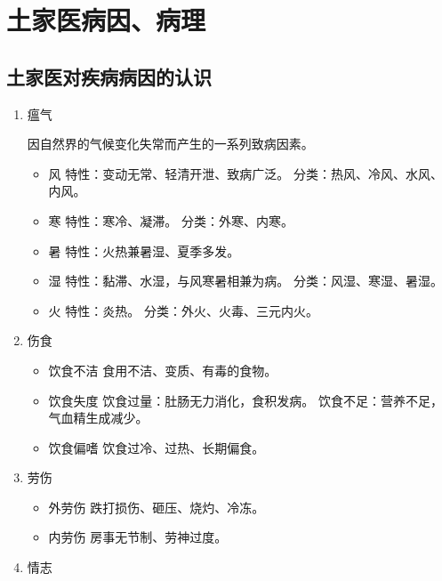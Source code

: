 \documentclass[cn,hazy,black,12pt,normal,founder]{elegantnote}
\begin{document}
\section{土家医病因、病理}

\subsection{土家医对疾病病因的认识}

\begin{enumerate}
  \item 瘟气

  因自然界的气候变化失常而产生的一系列致病因素。

  \begin{itemize}
    \item 风
    \subitem 特性：变动无常、轻清开泄、致病广泛。
    \subitem 分类：热风、冷风、水风、内风。

    \item 寒
    \subitem 特性：寒冷、凝滞。
    \subitem 分类：外寒、内寒。
    \item 暑
    \subitem 特性：火热兼暑湿、夏季多发。
    \item 湿
    \subitem 特性：黏滞、水湿，与风寒暑相兼为病。
    \subitem 分类：风湿、寒湿、暑湿。
    \item 火
    \subitem 特性：炎热。
    \subitem 分类：外火、火毒、三元内火。
  \end{itemize}

  \item 伤食

  \begin{itemize}
    \item 饮食不洁
    \subitem 食用不洁、变质、有毒的食物。
    \item 饮食失度
    \subitem 饮食过量：肚肠无力消化，食积发病。
    \subitem 饮食不足：营养不足，气血精生成减少。
    \item 饮食偏嗜
    \subitem 饮食过冷、过热、长期偏食。
  \end{itemize}

  \item 劳伤

  \begin{itemize}
    \item 外劳伤
    \subitem 跌打损伤、砸压、烧灼、冷冻。
    \item 内劳伤
    \subitem 房事无节制、劳神过度。
  \end{itemize}

  \item 情志


\end{enumerate}
\end{document}

